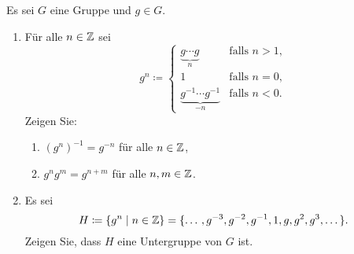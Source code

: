 \begin{question}
 Es sei $G$ eine Gruppe und $g \in G$. 
 \begin{enumerate}
  \item
   Für alle $n \in \mathbb{Z}$ sei
   \[
    g^n \coloneqq
    \begin{cases}
     \underbrace{g \dotsm g}_n              & \text{falls $n > 1$}, \\
     1                                      & \text{falls $n = 0$}, \\
     \underbrace{g^{-1} \dotsm g^{-1}}_{-n} & \text{falls $n < 0$}.
    \end{cases}
   \]
   Zeigen Sie:
   \begin{enumerate}
    \item
     $(g^n)^{-1} = g^{-n}$ für alle $n \in \mathbb{Z}$,
    \item
     $g^n g^m = g^{n+m}$ für alle $n,m \in \mathbb{Z}$.
   \end{enumerate}
  \item
   Es sei
   \[
    H \coloneqq \{g^n \mid n \in \mathbb{Z}\} = \{ \dotso, g^{-3}, g^{-2}, g^{-1}, 1, g, g^2, g^3, \dotso \}.
   \]
   Zeigen Sie, dass $H$ eine Untergruppe von $G$ ist.
 \end{enumerate}
\end{question}
